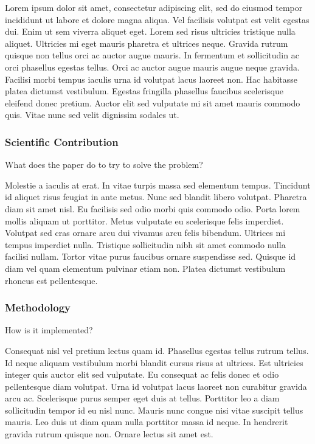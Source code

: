 \vskip 1cm

Lorem ipsum dolor sit amet, consectetur adipiscing elit, sed do eiusmod tempor incididunt ut labore et dolore magna aliqua. Vel facilisis volutpat est velit egestas dui. Enim ut sem viverra aliquet eget. Lorem sed risus ultricies tristique nulla aliquet. Ultricies mi eget mauris pharetra et ultrices neque. Gravida rutrum quisque non tellus orci ac auctor augue mauris. In fermentum et sollicitudin ac orci phasellus egestas tellus. Orci ac auctor augue mauris augue neque gravida. Facilisi morbi tempus iaculis urna id volutpat lacus laoreet non. Hac habitasse platea dictumst vestibulum. Egestas fringilla phasellus faucibus scelerisque eleifend donec pretium. Auctor elit sed vulputate mi sit amet mauris commodo quis. Vitae nunc sed velit dignissim sodales ut.



\subsubsection*{Scientific Contribution}

What does the paper do to try to solve the problem?

\vskip 1cm

Molestie a iaculis at erat. In vitae turpis massa sed elementum tempus. Tincidunt id aliquet risus feugiat in ante metus. Nunc sed blandit libero volutpat. Pharetra diam sit amet nisl. Eu facilisis sed odio morbi quis commodo odio. Porta lorem mollis aliquam ut porttitor. Metus vulputate eu scelerisque felis imperdiet. Volutpat sed cras ornare arcu dui vivamus arcu felis bibendum. Ultrices mi tempus imperdiet nulla. Tristique sollicitudin nibh sit amet commodo nulla facilisi nullam. Tortor vitae purus faucibus ornare suspendisse sed. Quisque id diam vel quam elementum pulvinar etiam non. Platea dictumst vestibulum rhoncus est pellentesque.


\subsubsection*{Methodology}

How is it implemented?

\vskip 1cm

Consequat nisl vel pretium lectus quam id. Phasellus egestas tellus rutrum tellus. Id neque aliquam vestibulum morbi blandit cursus risus at ultrices. Est ultricies integer quis auctor elit sed vulputate. Eu consequat ac felis donec et odio pellentesque diam volutpat. Urna id volutpat lacus laoreet non curabitur gravida arcu ac. Scelerisque purus semper eget duis at tellus. Porttitor leo a diam sollicitudin tempor id eu nisl nunc. Mauris nunc congue nisi vitae suscipit tellus mauris. Leo duis ut diam quam nulla porttitor massa id neque. In hendrerit gravida rutrum quisque non. Ornare lectus sit amet est.


